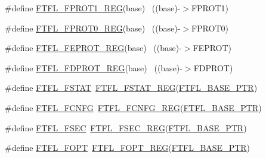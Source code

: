\begin{DoxyCompactItemize}
\item 
\#define \hyperlink{group___f_t_f_l___register___accessor___macros_ga85bbb8d73e9e3ed4ef8a2092ad6e9f8f}{F\+T\+F\+L\+\_\+\+F\+P\+R\+O\+T1\+\_\+\+R\+EG}(base)                                    ~((base)-\/$>$F\+P\+R\+O\+T1)
\item 
\#define \hyperlink{group___f_t_f_l___register___accessor___macros_gadbe6ebb9c0f6665200249c5295cc8947}{F\+T\+F\+L\+\_\+\+F\+P\+R\+O\+T0\+\_\+\+R\+EG}(base)                                    ~((base)-\/$>$F\+P\+R\+O\+T0)
\item 
\#define \hyperlink{group___f_t_f_l___register___accessor___macros_ga35c7eb7ca866e4e5743e81f5a523e402}{F\+T\+F\+L\+\_\+\+F\+E\+P\+R\+O\+T\+\_\+\+R\+EG}(base)                                    ~((base)-\/$>$F\+E\+P\+R\+OT)
\item 
\#define \hyperlink{group___f_t_f_l___register___accessor___macros_ga317742f25d2e4ee9faa22f74f930ef61}{F\+T\+F\+L\+\_\+\+F\+D\+P\+R\+O\+T\+\_\+\+R\+EG}(base)                                    ~((base)-\/$>$F\+D\+P\+R\+OT)
\item 
\#define \hyperlink{group___f_t_f_l___register___accessor___macros_gaf013df9b271efd73b20bbad665ed5ce8}{F\+T\+F\+L\+\_\+\+F\+S\+T\+AT}~\hyperlink{group___f_t_f_l___register___accessor___macros_ga61843e4cd8d028e949b2bcef7580f03d}{F\+T\+F\+L\+\_\+\+F\+S\+T\+A\+T\+\_\+\+R\+EG}(\hyperlink{group___f_t_f_l___peripheral_gad2bcbae914ba8547b96791479afda939}{F\+T\+F\+L\+\_\+\+B\+A\+S\+E\+\_\+\+P\+TR})
\item 
\#define \hyperlink{group___f_t_f_l___register___accessor___macros_ga801916a2948fcc50d4c5abf71322dcc6}{F\+T\+F\+L\+\_\+\+F\+C\+N\+FG}~\hyperlink{group___f_t_f_l___register___accessor___macros_gad717b12e5cd4f849ad44ccc811a25685}{F\+T\+F\+L\+\_\+\+F\+C\+N\+F\+G\+\_\+\+R\+EG}(\hyperlink{group___f_t_f_l___peripheral_gad2bcbae914ba8547b96791479afda939}{F\+T\+F\+L\+\_\+\+B\+A\+S\+E\+\_\+\+P\+TR})
\item 
\#define \hyperlink{group___f_t_f_l___register___accessor___macros_ga5c6d55c5886dd7e351c462fe9042cbab}{F\+T\+F\+L\+\_\+\+F\+S\+EC}~\hyperlink{group___f_t_f_l___register___accessor___macros_ga24c533d0a36f2a369d16c5801fa99c90}{F\+T\+F\+L\+\_\+\+F\+S\+E\+C\+\_\+\+R\+EG}(\hyperlink{group___f_t_f_l___peripheral_gad2bcbae914ba8547b96791479afda939}{F\+T\+F\+L\+\_\+\+B\+A\+S\+E\+\_\+\+P\+TR})
\item 
\#define \hyperlink{group___f_t_f_l___register___accessor___macros_ga52e8765b3167ad9a747a0b45e8474ca1}{F\+T\+F\+L\+\_\+\+F\+O\+PT}~\hyperlink{group___f_t_f_l___register___accessor___macros_gaa19b55e321560f11e71f7cba374dbe7e}{F\+T\+F\+L\+\_\+\+F\+O\+P\+T\+\_\+\+R\+EG}(\hyperlink{group___f_t_f_l___peripheral_gad2bcbae914ba8547b96791479afda939}{F\+T\+F\+L\+\_\+\+B\+A\+S\+E\+\_\+\+P\+TR})

\end{DoxyCompactItemize}
